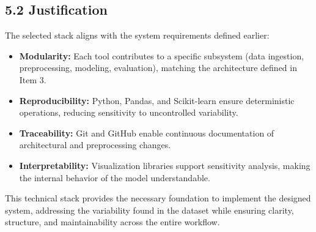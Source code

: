 \documentclass[12pt]{report}
\begin{document}
\subsection*{5.2 Justification}

The selected stack aligns with the system requirements defined earlier:

\begin{itemize}
    \item \textbf{Modularity:} Each tool contributes to a specific subsystem 
    (data ingestion, preprocessing, modeling, evaluation), matching the architecture 
    defined in Item 3.
    \item \textbf{Reproducibility:} Python, Pandas, and Scikit-learn ensure deterministic 
    operations, reducing sensitivity to uncontrolled variability.
    \item \textbf{Traceability:} Git and GitHub enable continuous documentation of 
    architectural and preprocessing changes.
    \item \textbf{Interpretability:} Visualization libraries support sensitivity analysis, 
    making the internal behavior of the model understandable.
\end{itemize}

This technical stack provides the necessary foundation to implement the designed system, 
addressing the variability found in the dataset while ensuring clarity, structure, 
and maintainability across the entire workflow.
\end{document}
